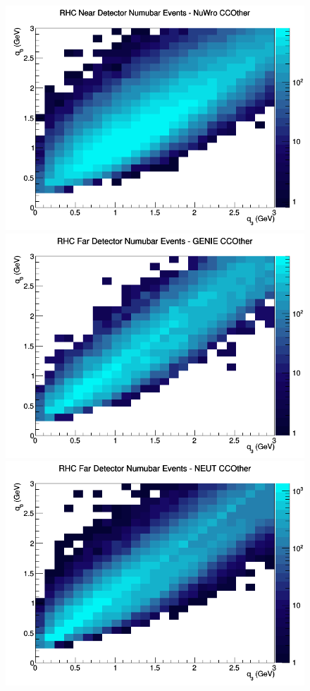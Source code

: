 \documentclass[12pt]{article}
\begin{document}
\begin{figure}[h]
\includegraphics[width=\linewidth]{eff_q0_q3/GAr/CCOther_RHC_ND_numubar_q3_q0_NuWro.png}
\endminipage
\newline
{}
\includegraphics[width=\linewidth]{eff_q0_q3/GAr/CCOther_RHC_FD_numubar_q3_q0_GENIE.png}
\endminipage
{}
\includegraphics[width=\linewidth]{eff_q0_q3/GAr/CCOther_RHC_FD_numubar_q3_q0_NEUT.png}

\end{figure}
\end{document}
